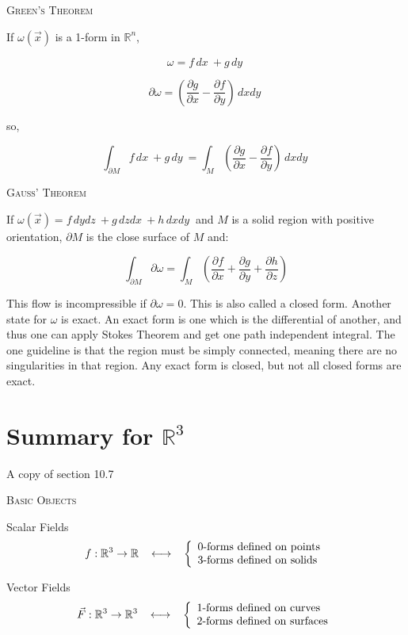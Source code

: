 \documentclass{article}
\begin{document}
\bigskip

\textsc{Green's Theorem}

If $\omega(\vec{x})$ is a 1-form in $\mathbb{R}^n$, 

\[
\omega = f\,dx\ + g\,dy\
\]

\[
\partial{\omega} = \left(\frac{\partial{g}}{\partial{x}} - \frac{\partial{f}}{\partial{y}}\right) \,dxdy\
\]

so,

\[
\int_{\partial{M}} f\,dx\ + g\,dy\ = \int_M \left(\frac{\partial{g}}{\partial{x}} - \frac{\partial{f}}{\partial{y}}\right) \,dxdy\
\]

\bigskip

\textsc{Gauss' Theorem}

If $\omega(\vec{x}) = f\,dydz\ + g\,dzdx\ + h\,dxdy\ $ and $M$ is a solid region with positive orientation, $\partial{M}$ is the close surface of $M$ and:

\[
\int_{\partial{M}} \partial{\omega} = \int_M \left( \frac{\partial{f}}{\partial{x}} + \frac{\partial{g}}{\partial{y}} + \frac{\partial{h}}{\partial{z}}\right)
\]

This flow is incompressible if $\partial{\omega} = 0$.  This is also called a closed form.  Another state for $\omega$ is exact.  An exact form is one which is the differential of another, and thus one can apply Stokes Theorem and get one path independent integral.  The one guideline is that the region must be simply connected, meaning there are no singularities in that region.  Any exact form is closed, but not all closed forms are exact.

\bigskip

\section{Summary for $\mathbb{R}^3$}
A copy of section 10.7
\bigskip

\textsc{Basic Objects}

Scalar Fields
\[
f: \mathbb{R}^3 \to \mathbb{R} \hspace{3mm} \longleftrightarrow \hspace{3mm} \left\{ \begin{array}{ll}
 \mbox{0-forms defined on points}  \\
 \mbox{3-forms defined on solids}
\end{array} \right.
\]

\smallskip

Vector Fields
\[
\vec{F}: \mathbb{R}^3 \to \mathbb{R}^3 \hspace{3mm} \longleftrightarrow \hspace{3mm} \left\{ \begin{array}{ll}
\mbox{1-forms defined on curves} \\
\mbox{2-forms defined on surfaces}  
\end{array} \right.
\]
\end{document}
